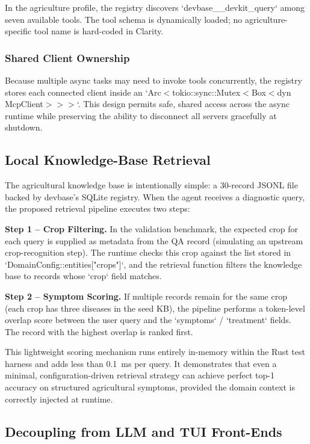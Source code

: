 \documentclass[11pt,a4paper]{article}
\begin{document}
In the agriculture profile, the registry discovers `devbase__devkit\_query` among seven available tools. The tool schema is dynamically loaded; no agriculture-specific tool name is hard-coded in Clarity.

\subsubsection{Shared Client Ownership}

Because multiple async tasks may need to invoke tools concurrently, the registry stores each connected client inside an `Arc$<$tokio::sync::Mutex$<$Box$<$dyn McpClient$>$$>$$>$`. This design permits safe, shared access across the async runtime while preserving the ability to disconnect all servers gracefully at shutdown.

\subsection{Local Knowledge-Base Retrieval}

The agricultural knowledge base is intentionally simple: a 30-record JSONL file backed by devbase's SQLite registry. When the agent receives a diagnostic query, the proposed retrieval pipeline executes two steps:

\textbf{Step 1 -- Crop Filtering.} In the validation benchmark, the expected crop for each query is supplied as metadata from the QA record (simulating an upstream crop-recognition step). The runtime checks this crop against the list stored in `DomainConfig::entities["crops"]`, and the retrieval function filters the knowledge base to records whose `crop` field matches.

\textbf{Step 2 -- Symptom Scoring.} If multiple records remain for the same crop (each crop has three diseases in the seed KB), the pipeline performs a token-level overlap score between the user query and the `symptoms` / `treatment` fields. The record with the highest overlap is ranked first.

This lightweight scoring mechanism runs entirely in-memory within the Rust test harness and adds less than 0.1~ms per query. It demonstrates that even a minimal, configuration-driven retrieval strategy can achieve perfect top-1 accuracy on structured agricultural symptoms, provided the domain context is correctly injected at runtime.

\subsection{Decoupling from LLM and TUI Front-Ends}
\end{document}
